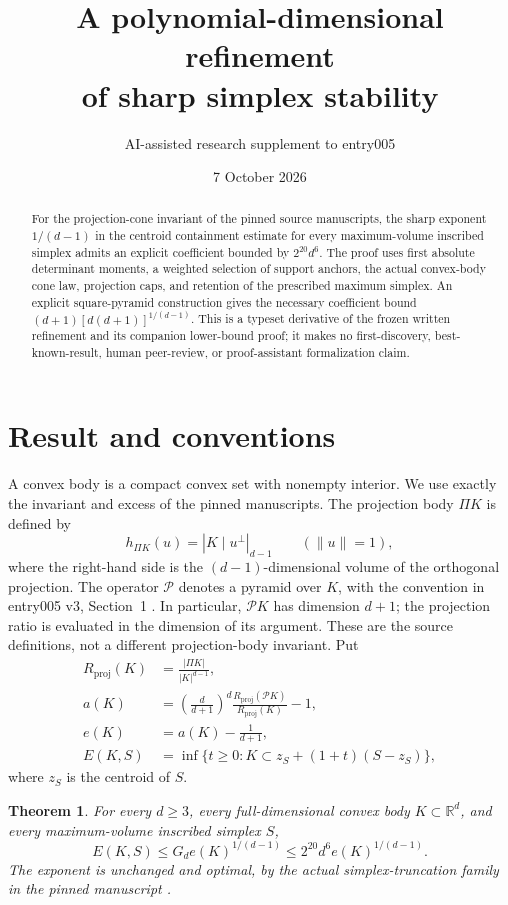 \documentclass[11pt,letterpaper]{article}
\title{A polynomial-dimensional refinement\\of sharp simplex stability}
\author{AI-assisted research supplement to entry005}
\date{7 October 2026}
\newtheorem*{maintheorem}{Theorem}
\newcommand{\RR}{\mathbb R}
\newcommand{\Rproj}{R_{\mathrm{proj}}}
\begin{document}
\maketitle
\vspace{-1.5em}
\begin{abstract}
For the projection-cone invariant of the pinned source manuscripts, the
sharp exponent $1/(d-1)$ in the centroid containment estimate for every
maximum-volume inscribed simplex admits an explicit coefficient bounded by
$2^{20}d^6$. The proof uses first absolute determinant moments, a weighted
selection of support anchors, the actual convex-body cone law, projection
caps, and retention of the prescribed maximum simplex. An explicit
square-pyramid construction gives the necessary coefficient bound
$(d+1)[d(d+1)]^{1/(d-1)}$. This is a typeset derivative of the frozen
written refinement and its companion lower-bound proof; it makes no
first-discovery, best-known-result, human peer-review, or proof-assistant
formalization claim.
\end{abstract}

\section*{Result and conventions}
A convex body is a compact convex set with nonempty interior. We use exactly
the invariant and excess of the pinned manuscripts. The projection body
$\Pi K$ is defined by
\[
 h_{\Pi K}(u)=|K\mid u^\perp|_{d-1}\qquad (\|u\|=1),
\]
where the right-hand side is the $(d-1)$-dimensional volume of the orthogonal
projection. The operator $\mathcal P$ denotes a pyramid over $K$, with the
convention in entry005 v3, Section~1 \cite{entry}. In particular,
$\mathcal P K$ has dimension $d+1$; the projection ratio is evaluated in
the dimension of its argument. These are the source definitions, not a
different projection-body invariant. Put
\begin{align*}
 \Rproj(K)&=\frac{|\Pi K|}{|K|^{d-1}},\\
 a(K)&=\left(\frac d{d+1}\right)^d
       \frac{\Rproj(\mathcal P K)}{\Rproj(K)}-1,\\
 e(K)&=a(K)-\frac1{d+1},\\
 E(K,S)&=\inf\{t\ge0:K\subset z_S+(1+t)(S-z_S)\},
\end{align*}
where $z_S$ is the centroid of $S$.

\begin{maintheorem}
For every $d\ge3$, every full-dimensional convex body $K\subset\RR^d$,
and every maximum-volume inscribed simplex $S$,
\[
 E(K,S)\le G_d e(K)^{1/(d-1)}
          \le 2^{20}d^6 e(K)^{1/(d-1)}.
\]
The exponent is unchanged and optimal, by the actual simplex-truncation
family in the pinned manuscript \cite{sharp,truncation}.
\end{maintheorem}
\end{document}
